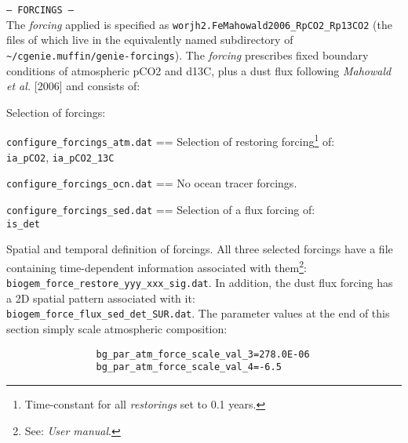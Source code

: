 \documentclass[10pt,twoside]{article}
\begin{document}
\begin{compactitem}
        \item \texttt{--- FORCINGS ---}
        \\ The \textit{forcing} applied is specified as \texttt{worjh2.FeMahowald2006\_RpCO2\_Rp13CO2} (the files of which live in the equivalently named subdirectory of \texttt{\~{}/cgenie.muffin/genie-forcings}). The \textit{forcing} prescribes fixed boundary conditions of atmospheric pCO2 and d13C, plus a dust flux following \textit{Mahowald et al.} [2006] and consists of:
        \begin{compactitem}
                \item Selection of forcings:
                \begin{compactenum}
                        \item  \texttt{configure\_forcings\_atm.dat} == Selection of restoring forcing\footnote{Time-constant for all \textit{restorings} set to 0.1 years.} of:
                        \\\texttt{ia\_pCO2}, \texttt{ia\_pCO2\_13C}
                        \item  \texttt{configure\_forcings\_ocn.dat} == No ocean tracer forcings.
                        \item  \texttt{configure\_forcings\_sed.dat} == Selection of a flux forcing of:
                        \\\texttt{is\_det}
                \end{compactenum}
                \item Spatial and temporal definition of forcings. All three selected forcings have a file containing time-dependent information associated with them\footnote{See: \textit{User manual}.}: \texttt{biogem\_force\_restore\_yyy\_xxx\_sig.dat}. In addition, the dust flux forcing has a 2D spatial pattern associated with it:
                \\ \texttt{biogem\_force\_flux\_sed\_det\_SUR.dat}.
                The parameter values at the end of this section simply scale atmospheric composition:
                \vspace{-5pt}\begin{verbatim}
                bg_par_atm_force_scale_val_3=278.0E-06
                bg_par_atm_force_scale_val_4=-6.5
                \end{verbatim}\vspace{-5pt}
        \end{compactitem}
        
\end{compactitem}
\end{document}
